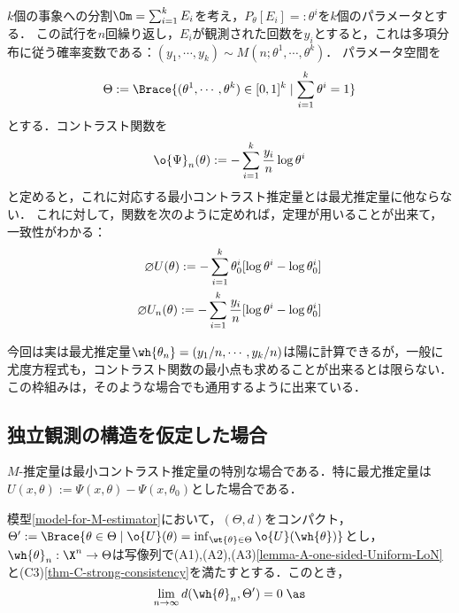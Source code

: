 \documentclass[uplatex,dvipdfmx]{jsreport}
\begin{document}
\begin{example}[多項分布に対する最尤推定量]\label{exp-multinomial-model}
    $k$個の事象への分割$\Om=\sum^k_{i=1}E_i$を考え，$P_\theta[E_i]=:\theta^i$を$k$個のパラメータとする．
    この試行を$n$回繰り返し，$E_i$が観測された回数を$y_i$とすると，これは多項分布に従う確率変数である：$(y_1,\cdots,y_k)\sim M(n;\theta^1,\cdots,\theta^k)$．
    パラメータ空間を
    \[\Theta:=\Brace{(\theta^1,\cdots,\theta^k)\in[0,1]^k\mid\sum^k_{i=1}\theta^i=1}\]
    とする．コントラスト関数を
    \[\o{\Psi}_n(\theta):=-\sum^k_{i=1}\frac{y_i}{n}\log\theta^i\]
    と定めると，これに対応する最小コントラスト推定量とは最尤推定量に他ならない．
    これに対して，関数を次のように定めれば，定理が用いることが出来て，一致性がわかる：
    \begin{align*}
        \o{U}(\theta):=-\sum^k_{i=1}\theta^i_0[\log\theta^i-\log\theta^i_0]\\
        \o{U}_n(\theta):=-\sum^k_{i=1}\frac{y_i}{n}[\log\theta^i-\log\theta^i_0]
    \end{align*}

    今回は実は最尤推定量$\wh{\theta_n}=(y_1/n,\cdots,y_k/n)$は陽に計算できるが，一般に尤度方程式も，コントラスト関数の最小点も求めることが出来るとは限らない．
    この枠組みは，そのような場合でも通用するように出来ている．
\end{example}

\subsection{独立観測の構造を仮定した場合}

\begin{tcolorbox}[colframe=ForestGreen, colback=ForestGreen!10!white,breakable,colbacktitle=ForestGreen!40!white,coltitle=black,fonttitle=\bfseries\sffamily,
title=]
    $M$-推定量は最小コントラスト推定量の特別な場合である．特に最尤推定量は$U(x,\theta):=\Psi(x,\theta)-\Psi(x,\theta_0)$とした場合である．
\end{tcolorbox}

\begin{theorem}[$M$-推定量の強一致性の十分条件]\label{thm-strong-consistency-for-M-estimator}
    模型\ref{model-for-M-estimator}において，$(\Theta,d)$をコンパクト，$\Theta':=\Brace{\theta\in\Theta\mid\o{U}(\theta)=\inf_{\wt{\theta}\in\Theta}\o{U}(\wh{\theta})}$とし，$\wh{\theta}_n:\X^n\to\Theta$は写像列で(A1),(A2),(A3)\ref{lemma-A-one-sided-Uniform-LoN}と(C3)\ref{thm-C-strong-consistency}を満たすとする．このとき，
    \[\lim_{n\to\infty}d(\wh{\theta}_n,\Theta')=0\;\as\]
\end{theorem}
\end{document}
